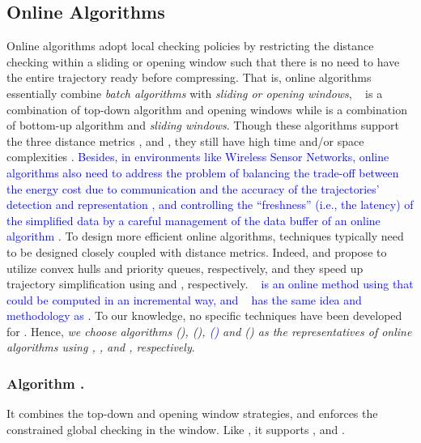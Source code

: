 \subsection{Online Algorithms}

Online \lsa algorithms adopt local checking policies by restricting the distance checking within a sliding or opening window such that there is no need to have the entire trajectory ready before compressing. That is, online algorithms essentially combine {\em batch algorithms} with {\em sliding or opening windows}, \eg\
\opwa \cite{Meratnia:Spatiotemporal} is a combination of top-down algorithm \dpa and opening windows while  \cite{Keogh:online} is a combination of bottom-up algorithm \tpa and \textit{sliding windows}.
%
Though these algorithms support the three distance metrics \ped, \sed and \dad, they still have high time and/or space complexities \cite{Liu:BQS}.
%
\textcolor{blue}{Besides, in environments like Wireless Sensor Networks, online algorithms also need to address the problem of balancing the trade-off between the energy cost due to communication and the accuracy of the trajectories’ detection and representation \cite{Ghica:DTracking}, and controlling the ``freshness” (i.e., the latency) of the simplified data by a careful management of the data buffer of an online algorithm \cite{Ghica:DTracking}.}
%
To design more efficient online algorithms, techniques typically need to be designed closely coupled with distance metrics.
Indeed, \bqsa \cite{Liu:BQS} and \squishe \cite{Muckell:Compression} propose to utilize convex hulls and priority queues, respectively, and they speed up trajectory simplification using \ped and \sed, respectively. 
\textcolor{blue}{\dagots~\cite{Cao:Dots} is an online method using \lissed that could be computed in an incremental way, and \olts~\cite{Wu:Graph} has the same idea and methodology as \dagots.}
To our knowledge, no specific techniques have been developed for \dad.
Hence, {\em we choose algorithms \bqsa (), \squishe (), \textcolor{blue}{\dagots ()} and \opwa () as the representatives of online algorithms using \ped, \sed, \textcolor{blue}{\lissed} and \dad, respectively}.



\subsubsection{Algorithm \opwa \cite{Meratnia:Spatiotemporal}.}
It combines the top-down and opening window strategies, and enforces the constrained global checking in the window. Like \dpa, it supports \ped, \sed and \dad.

